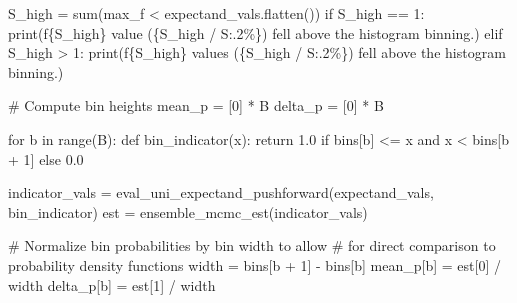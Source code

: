 \documentclass[
  letterpaper,
  DIV=11,
  numbers=noendperiod]{scrartcl}
\newenvironment{Shaded}{\begin{snugshade}}{\end{snugshade}}
\newcommand{\BuiltInTok}[1]{\textcolor[rgb]{0.00,0.23,0.31}{#1}}
\newcommand{\CommentTok}[1]{\textcolor[rgb]{0.37,0.37,0.37}{#1}}
\newcommand{\ControlFlowTok}[1]{\textcolor[rgb]{0.00,0.23,0.31}{#1}}
\newcommand{\DecValTok}[1]{\textcolor[rgb]{0.68,0.00,0.00}{#1}}
\newcommand{\FloatTok}[1]{\textcolor[rgb]{0.68,0.00,0.00}{#1}}
\newcommand{\KeywordTok}[1]{\textcolor[rgb]{0.00,0.23,0.31}{#1}}
\newcommand{\NormalTok}[1]{\textcolor[rgb]{0.00,0.23,0.31}{#1}}
\newcommand{\OperatorTok}[1]{\textcolor[rgb]{0.37,0.37,0.37}{#1}}
\newcommand{\SpecialCharTok}[1]{\textcolor[rgb]{0.37,0.37,0.37}{#1}}
\newcommand{\SpecialStringTok}[1]{\textcolor[rgb]{0.13,0.47,0.30}{#1}}
\newcommand{\StringTok}[1]{\textcolor[rgb]{0.13,0.47,0.30}{#1}}
\begin{document}
\begin{Shaded}
\begin{Highlighting}[]
\NormalTok{  S\_high }\OperatorTok{=} \BuiltInTok{sum}\NormalTok{(max\_f }\OperatorTok{\textless{}}\NormalTok{ expectand\_vals.flatten())}
  \ControlFlowTok{if}\NormalTok{ S\_high }\OperatorTok{==} \DecValTok{1}\NormalTok{:}
    \BuiltInTok{print}\NormalTok{(}\SpecialStringTok{f\textquotesingle{}}\SpecialCharTok{\{}\NormalTok{S\_high}\SpecialCharTok{\}}\SpecialStringTok{ value (}\SpecialCharTok{\{}\NormalTok{S\_high }\OperatorTok{/}\NormalTok{ S}\SpecialCharTok{:.2\%\}}\SpecialStringTok{)\textquotesingle{}}
           \StringTok{\textquotesingle{} fell above the histogram binning.\textquotesingle{}}\NormalTok{)}
  \ControlFlowTok{elif}\NormalTok{ S\_high }\OperatorTok{\textgreater{}} \DecValTok{1}\NormalTok{:}
    \BuiltInTok{print}\NormalTok{(}\SpecialStringTok{f\textquotesingle{}}\SpecialCharTok{\{}\NormalTok{S\_high}\SpecialCharTok{\}}\SpecialStringTok{ values (}\SpecialCharTok{\{}\NormalTok{S\_high }\OperatorTok{/}\NormalTok{ S}\SpecialCharTok{:.2\%\}}\SpecialStringTok{)\textquotesingle{}}
           \StringTok{\textquotesingle{} fell above the histogram binning.\textquotesingle{}}\NormalTok{)}

  \CommentTok{\# Compute bin heights}
\NormalTok{  mean\_p }\OperatorTok{=}\NormalTok{ [}\DecValTok{0}\NormalTok{] }\OperatorTok{*}\NormalTok{ B}
\NormalTok{  delta\_p }\OperatorTok{=}\NormalTok{ [}\DecValTok{0}\NormalTok{] }\OperatorTok{*}\NormalTok{ B}
  
  \ControlFlowTok{for}\NormalTok{ b }\KeywordTok{in} \BuiltInTok{range}\NormalTok{(B):}
    \KeywordTok{def}\NormalTok{ bin\_indicator(x):}
      \ControlFlowTok{return} \FloatTok{1.0} \ControlFlowTok{if}\NormalTok{ bins[b] }\OperatorTok{\textless{}=}\NormalTok{ x }\KeywordTok{and}\NormalTok{ x }\OperatorTok{\textless{}}\NormalTok{ bins[b }\OperatorTok{+} \DecValTok{1}\NormalTok{] }\ControlFlowTok{else} \FloatTok{0.0}
    
\NormalTok{    indicator\_vals }\OperatorTok{=}\NormalTok{ eval\_uni\_expectand\_pushforward(expectand\_vals,}
\NormalTok{                                                    bin\_indicator)}
\NormalTok{    est }\OperatorTok{=}\NormalTok{ ensemble\_mcmc\_est(indicator\_vals)}
    
    \CommentTok{\# Normalize bin probabilities by bin width to allow}
    \CommentTok{\# for direct comparison to probability density functions}
\NormalTok{    width }\OperatorTok{=}\NormalTok{ bins[b }\OperatorTok{+} \DecValTok{1}\NormalTok{] }\OperatorTok{{-}}\NormalTok{ bins[b]}
\NormalTok{    mean\_p[b] }\OperatorTok{=}\NormalTok{ est[}\DecValTok{0}\NormalTok{] }\OperatorTok{/}\NormalTok{ width}
\NormalTok{    delta\_p[b] }\OperatorTok{=}\NormalTok{ est[}\DecValTok{1}\NormalTok{] }\OperatorTok{/}\NormalTok{ width}
  

\end{Highlighting}
\end{Shaded}
\end{document}
